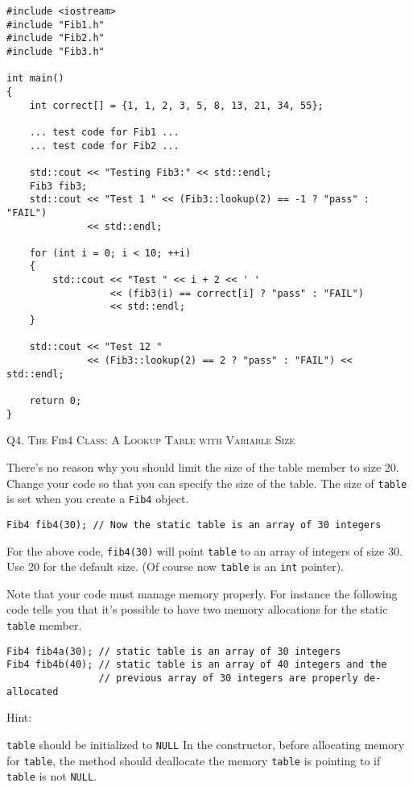 \begin{Verbatim}[frame=single]
#include <iostream>
#include "Fib1.h"
#include "Fib2.h"
#include "Fib3.h"

int main()
{
    int correct[] = {1, 1, 2, 3, 5, 8, 13, 21, 34, 55};

    ... test code for Fib1 ...
    ... test code for Fib2 ...
    
    std::cout << "Testing Fib3:" << std::endl;
    Fib3 fib3;
    std::cout << "Test 1 " << (Fib3::lookup(2) == -1 ? "pass" : "FAIL")
              << std::endl;

    for (int i = 0; i < 10; ++i)
    {
        std::cout << "Test " << i + 2 << ' '
                  << (fib3(i) == correct[i] ? "pass" : "FAIL")
                  << std::endl;
    }
      
    std::cout << "Test 12 "
              << (Fib3::lookup(2) == 2 ? "pass" : "FAIL") << std::endl;
    
    return 0;
}
\end{Verbatim}



\newpage
Q4.
\textsc{The Fib4 Class: A Lookup Table with Variable Size}

There's no reason why you should limit the size of the table member to size 20. Change your code
so that you can specify the size of the table. The size of \verb!table! is set when you create a \texttt{Fib4}
object.

\begin{Verbatim}[frame=single]
Fib4 fib4(30); // Now the static table is an array of 30 integers
\end{Verbatim}

For the above code, \verb!fib4(30)! will point \verb!table! to an array of integers of size 30. Use 20 for the
default size. (Of course now \verb!table! is an \verb!int! pointer).

Note that your code must manage memory properly. For instance the following code tells you that it's
possible to have two memory allocations for the static \verb!table! member.

\begin{Verbatim}[frame=single]
Fib4 fib4a(30); // static table is an array of 30 integers
Fib4 fib4b(40); // static table is an array of 40 integers and the
                // previous array of 30 integers are properly de-allocated
\end{Verbatim}

Hint:
\begin{tightlist}
  \li \verb!table! should be initialized to \verb!NULL!
  \li In the constructor, before allocating memory for \verb!table!, the method should deallocate the
  memory \verb!table! is pointing to if \verb!table! is not \verb!NULL!.
\end{tightlist}

